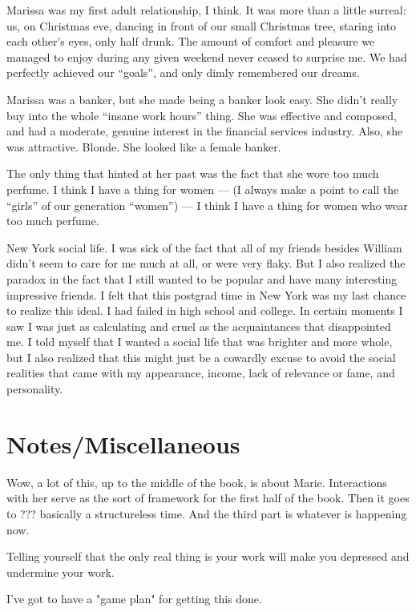 \documentclass[12pt]{article}
\begin{document}
Marissa was my first adult relationship, I think.  It was more than a little
surreal: us, on Christmas eve, dancing in front of our small Christmas tree,
staring into each other's eyes, only half drunk.  The amount of comfort and
pleasure we managed to enjoy during any given weekend never ceased to surprise
me.  We had perfectly achieved our ``goals'', and only dimly remembered our
dreams.

Marissa was a banker, but she made being a banker look easy.  She didn't really
buy into the whole ``insane work hours'' thing.  She was effective and composed,
and had a moderate, genuine interest in the financial services industry.  Also,
she was attractive.  Blonde.  She looked like a female banker. 

The only thing that hinted at her past was the fact that she wore too much
perfume.  I think I have a thing for women --- (I always make a point to call
the ``girls'' of our generation ``women'') --- I think I have a thing for women
who wear too much perfume.

New York social life.  I was sick of the fact that all of my friends besides
William didn't seem to care for me much at all, or were very flaky.  But I also
realized the paradox in the fact that I still wanted to be popular and have many
interesting impressive friends.  I felt that this postgrad time in New York was
my last chance to realize this ideal.  I had failed in high school and college.
In certain moments I saw I was just as calculating and cruel as the
acquaintances that disappointed me.  I told myself that I wanted a social life
that was brighter and more whole, but I also realized that this might just be a
cowardly excuse to avoid the social realities that came with my appearance,
income, lack of relevance or fame, and personality.


\section{Notes/Miscellaneous}
Wow, a lot of this, up to the middle of the book, is about Marie.  Interactions
with her serve as the sort of framework for the first half of the book.  Then it
goes to ???  basically a structureless time.  And the third part is whatever is
happening now.

Telling yourself that the only real thing is your work will make you depressed
and undermine your work.  

I've got to have a "game plan" for getting this done.
\end{document}
